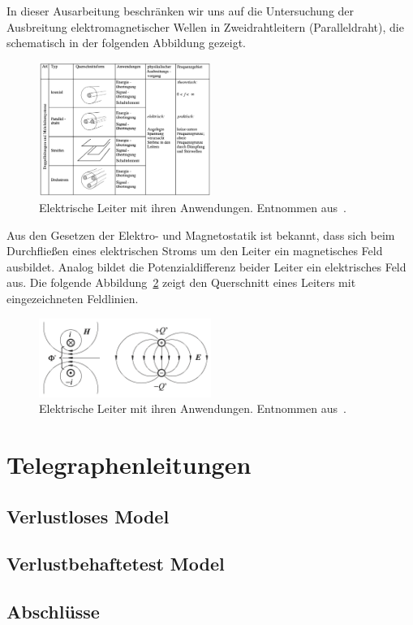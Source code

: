 \documentclass[paper=a4, parskip=half-, ngerman, fontsize=11pt]{scrreprt}
\begin{document}
In dieser Ausarbeitung beschränken wir uns auf die Untersuchung der Ausbreitung elektromagnetischer Wellen in
Zweidrahtleitern (Paralleldraht), die schematisch in der folgenden Abbildung gezeigt.
\begin{figure}[!h]
    \begin{center}
        \includegraphics[width=0.5\textwidth]{images/Leiter.png}
        \caption{Elektrische Leiter mit ihren Anwendungen. Entnommen aus~\cite{FernuniSkript}.}
        \label{Leiter}
    \end{center}
\end{figure}

Aus den Gesetzen der Elektro- und Magnetostatik ist bekannt, dass sich beim Durchfließen eines elektrischen Stroms um
den Leiter ein magnetisches Feld ausbildet. Analog bildet die Potenzialdifferenz beider Leiter ein elektrisches Feld
aus. Die folgende Abbildung~\ref{Felder} zeigt den Querschnitt eines Leiters mit eingezeichneten Feldlinien.


\begin{figure}[!h]
    \begin{center}
        \includegraphics[width=0.5\textwidth]{images/Felder.png}
        \caption{Elektrische Leiter mit ihren Anwendungen. Entnommen aus~\cite{LeitungenUndFilter}.}
        \label{Felder}
    \end{center}
\end{figure}







\chapter{Telegraphenleitungen}

\section{Verlustloses Model}

\section{Verlustbehaftetest Model}

\section{Abschlüsse}


\printbibliography
\end{document}
